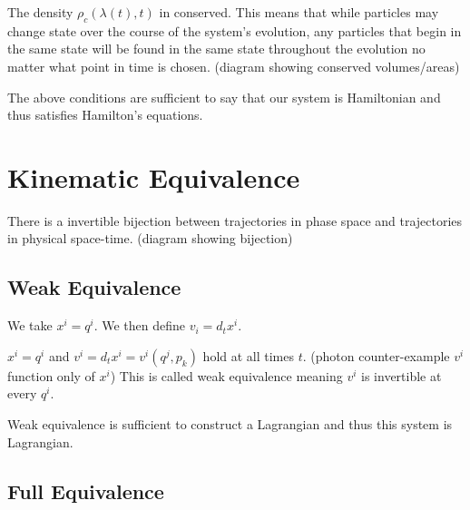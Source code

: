 \documentclass{article}
\begin{document}
\begin{prop}
	The density $\rho_c(\lambda(t),t)$ in conserved. This means that while particles may change state over the course of the system's evolution, any particles that begin in the same state will be found in the same state throughout the evolution no matter what point in time is chosen. (diagram showing conserved volumes/areas)
\end{prop}

\begin{prop}
	The above conditions are sufficient to say that our system is Hamiltonian and thus satisfies Hamilton's equations.
\end{prop} 
	

\section{Kinematic Equivalence}

\begin{assump}
	There is a invertible bijection between trajectories in phase space and trajectories in physical space-time. (diagram showing bijection)
\end{assump}

\subsection{Weak Equivalence}

\begin{defn}
	We take $x^i = q^i$. We then define $v_i = d_tx^i$.
\end{defn}

\begin{prop}
	$x^i = q^i$ and $v^i = d_tx^i = v^i(q^j,p_k)$ hold at all times $t$. (photon counter-example $v^i$ function only of $x^i$) This is called weak equivalence meaning $v^i$ is invertible at every $q^i$. 
\end{prop}

\begin{prop}
	Weak equivalence is sufficient to construct a Lagrangian and thus this system is Lagrangian.
\end{prop}

\subsection{Full Equivalence}
\end{document}
